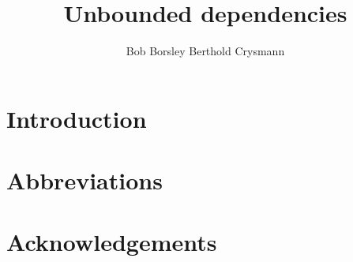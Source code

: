 \documentclass[output=paper]{langsci/langscibook}
\author{%
	Bob Borsley\affiliation{University of Essex}%
	\lastand Berthold Crysmann\affiliation{Université Paris Diderot}%
}
\title{Unbounded dependencies}
\begin{document}
\label{chap-udc}

\section{Introduction} 



 
\section*{Abbreviations}
\section*{Acknowledgements}

\printbibliography[heading=subbibliography,notkeyword=this] 
\end{document}
